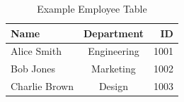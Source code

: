 \documentclass{article}
\begin{document}
\begin{table}[h] %
    \centering %
    \caption{Example Employee Table}
    \vspace{10pt} %
    \begin{tabular}{|l|c|r|}
        \hline
        \textbf{Name} & \textbf{Department} & \textbf{ID} \\
        \hline
        Alice Smith & Engineering & 1001 \\
        Bob Jones & Marketing & 1002 \\
        Charlie Brown & Design & 1003 \\
        \hline
    \end{tabular}
\end{table}
\end{document}
